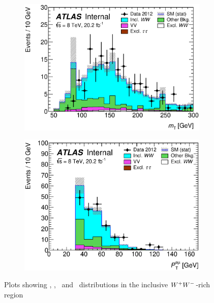 \begin{figure}[!h]
\begin{subfigure}{0.5\textwidth}
   \includegraphics[width=\textwidth]{figures/emme-xtraTracks-MT-lin.eps}
\end{subfigure} 
\begin{subfigure}{0.5\textwidth}
   \includegraphics[width=\textwidth]{figures/emme-xtraTracks-Ptll-lin.eps}
\end{subfigure} 
\caption{Plots showing \memu, \dFem, \mT\ and \pTemu\ distributions in the inclusive $W^+W^-$-rich region}
\label{fig:xtrkWWplots}
\end{figure}


